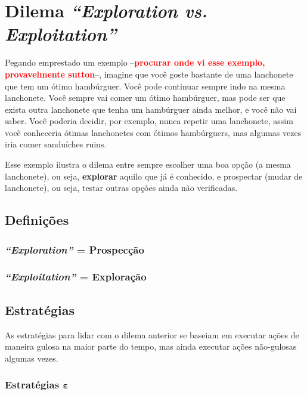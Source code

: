 \documentclass{article}
\newcommand{\todo}[1]{ --\textcolor{red}{\textbf{#1}}--}
\begin{document}
    \section{Dilema \textit{``Exploration vs. Exploitation''}}
    
        Pegando emprestado um exemplo \todo{procurar onde vi esse exemplo, provavelmente sutton}, imagine que você goste bastante de uma lanchonete que tem um ótimo hambúrguer. Você pode continuar sempre indo na mesma lanchonete. Você sempre vai comer um ótimo hambúrguer, mas pode ser que exista outra lanchonete que tenha um hambúrguer ainda melhor, e você não vai saber. Você poderia decidir, por exemplo, nunca repetir uma lanchonete, assim você conheceria ótimas lanchonetes com ótimos hambúrguers, mas algumas vezes iria comer sanduíches ruins.
        
        Esse exemplo ilustra o dilema entre sempre escolher uma boa opção (a mesma lanchonete), ou seja, \textbf{explorar} aquilo que já é conhecido, e prospectar (mudar de lanchonete), ou seja, testar outras opções ainda não verificadas. 
    
        \subsection{Definições}
        
            \subsubsection{\textit{``Exploration''} = Prospecção}
            
            \subsubsection{\textit{``Exploitation''} = Exploração}
        
        \subsection{Estratégias}
        
            As estratégias para lidar com o dilema anterior se baseiam em executar ações de maneira gulosa na maior parte do tempo, mas ainda executar ações não-gulosas algumas vezes.
        
            \subsubsection{Estratégias $\boldsymbol\varepsilon$}
            
\end{document}
